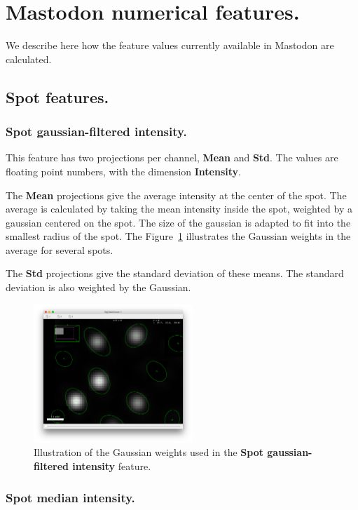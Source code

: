 \section{Mastodon numerical features.}
\label{FeaturesExplanation}

We describe here how the feature values currently available in Mastodon are calculated. 

\subsection{Spot features.}

\subsubsection{Spot gaussian-filtered intensity.}

This feature has two projections per channel, \textbf{Mean} and \textbf{Std}.
The values are floating point numbers, with the dimension \textbf{Intensity}.

The \textbf{Mean} projections give the average intensity at the center of the spot.
The average is calculated by taking the mean intensity inside the spot, weighted by a gaussian centered on the spot.
The size of the gaussian is adapted to fit into the smallest radius of the spot.
The Figure~\ref{fig:SpotGaussWeights} illustrates the Gaussian weights in the average for several spots.

The \textbf{Std} projections give the standard deviation of these means. 
The standard deviation is also weighted by the Gaussian.

\begin{figure}
    \centering
    \includegraphics[width=6cm]{figures/Mastodon_GaussMeanIntensityWeights.png}
    \caption{Illustration of the Gaussian weights used in the \textbf{Spot gaussian-filtered intensity} feature.}
    \label{fig:SpotGaussWeights}
\end{figure}
    
\subsubsection{Spot median intensity.}

